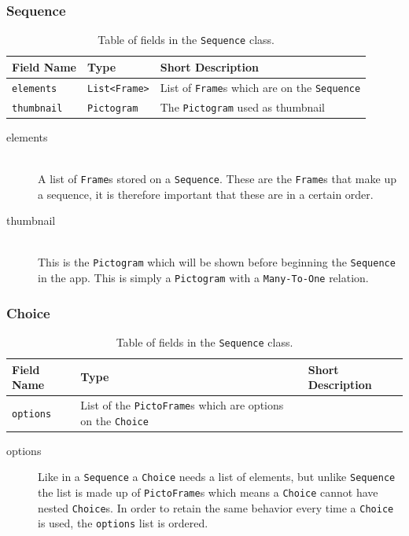 \subsubsection{Sequence} 
\begin{table}[H]
    \footnotesize
    \centering
    \begin{tabularx}{\textwidth}{ l X X }                                                 
        Field Name    & Type                                & Short Description                                \\
        \midrule
        \texttt{elements}        & \texttt{List\textless Frame\textgreater} & List of \texttt{Frame}s which are on the \texttt{Sequence} \\      
        \texttt{thumbnail}        & \texttt{Pictogram}       & The \texttt{Pictogram} used as thumbnail\\
    \end{tabularx}
    \caption{Table of fields in the \texttt{Sequence} class.}
    \label{tbl:sequence_class}
\end{table} 
\begin{description}
	\item[elements] \hfill \\
    A list of \texttt{Frame}s stored on a \texttt{Sequence}.
	These are the \texttt{Frame}s that make up a sequence, it is therefore important that these are in a certain order.
	\item[thumbnail] \hfill \\
    This is the \texttt{Pictogram} which will be shown before beginning the \texttt{Sequence} in the app.
	This is simply a \texttt{Pictogram} with a \texttt{Many-To-One} relation.
\end{description}

\subsubsection{Choice}  
\begin{table}[H]
    \footnotesize
    \centering
    \begin{tabularx}{\textwidth}{ l X X }                                                 
        Field Name    & Type                                & Short Description                                \\
        \midrule
        \texttt{options}        & List of the \texttt{PictoFrame}s which are options on the \texttt{Choice}\\      
    \end{tabularx}
    \caption{Table of fields in the \texttt{Sequence} class.}
    \label{tbl:sequence_class}
\end{table} 
\begin{description}
	\item[options] Like in a \texttt{Sequence} a \texttt{Choice} needs a list of elements, but unlike \texttt{Sequence} the list is made up of \texttt{PictoFrame}s which means a \texttt{Choice} cannot have nested \texttt{Choice}s.
    In order to retain the same behavior every time a \texttt{Choice} is used, the \texttt{options} list is ordered.
\end{description}
